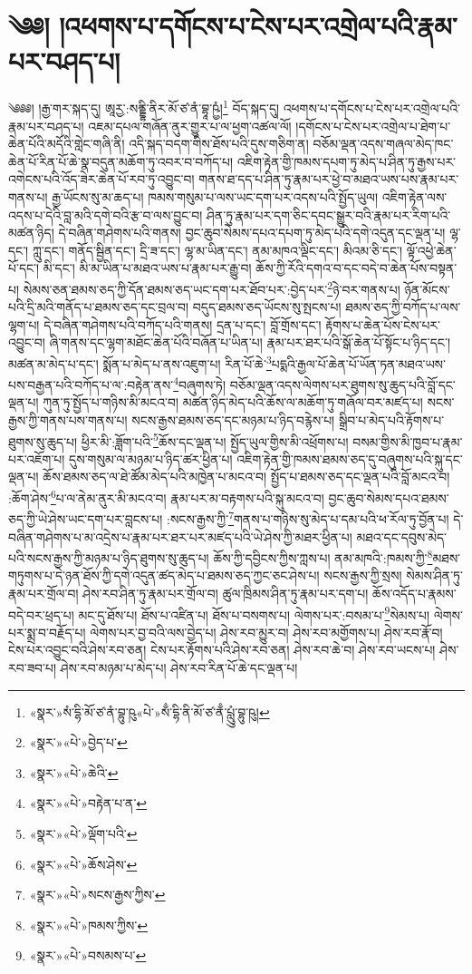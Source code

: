 \chapter{༄༅། །འཕགས་པ་དགོངས་པ་ངེས་པར་འགྲེལ་པའི་རྣམ་པར་བཤད་པ།}༄༅༅། །རྒྱ་གར་སྐད་དུ། ཨཱརྱ་:སནྡྷི་ནིར་མོ་ཙ་ནཾ་བྷཱ་ཥྱཾ།\footnote{«སྣར་»སཾ་དྷི་མོ་ཙ་ནཾ་བྷུ་ཥུ«པེ་»སྃ་དྷི་ནི་མོ་ཙ་ནྃ་པླུུཾ་བྷུ་ཥུ།} བོད་སྐད་དུ། འཕགས་པ་དགོངས་པ་ངེས་པར་འགྲེལ་པའི་རྣམ་པར་བཤད་པ། འཇམ་དཔལ་གཞོན་ནུར་གྱུར་པ་ལ་ཕྱག་འཚལ་ལོ། །དགོངས་པ་ངེས་པར་འགྲེལ་པ་ཐེག་པ་ཆེན་པོའི་མདོའི་གླེང་གཞི་ནི། འདི་སྐད་བདག་གིས་ཐོས་པའི་དུས་གཅིག་ན། བཅོམ་ལྡན་འདས་གཞལ་མེད་ཁང་ཆེན་པོ་རིན་པོ་ཆེ་སྣ་བདུན་མཆོག་ཏུ་འབར་བ་བཀོད་པ། འཇིག་རྟེན་གྱི་ཁམས་དཔག་ཏུ་མེད་པ་ཤིན་ཏུ་རྒྱས་པར་འགེངས་པའི་འོད་ཟེར་ཆེན་པོ་རབ་ཏུ་འབྱུང་བ། གནས་ཐ་དད་པ་ཤིན་ཏུ་རྣམ་པར་ཕྱེ་བ་མཐའ་ཡས་པས་རྣམ་པར་གནས་པ། རྒྱ་ཡོངས་སུ་མ་ཆད་པ། ཁམས་གསུམ་པ་ལས་ཡང་དག་པར་འདས་པའི་སྤྱོད་ཡུལ། འཇིག་རྟེན་ལས་འདས་པ་དེའི་བླ་མའི་དགེ་བའི་རྩ་བ་ལས་བྱུང་བ། ཤིན་ཏུ་རྣམ་པར་དག་ཅིང་དབང་སྒྱུར་བའི་རྣམ་པར་རིག་པའི་མཚན་ཉིད། དེ་བཞིན་གཤེགས་པའི་གནས། བྱང་ཆུབ་སེམས་དཔའ་དཔག་ཏུ་མེད་པའི་དགེ་འདུན་དང་ལྡན་པ། ལྷ་དང་། ཀླུ་དང་། གནོད་སྦྱིན་དང་། དྲི་ཟ་དང་། ལྷ་མ་ཡིན་དང་། ནམ་མཁའ་ལྡིང་དང་། མིའམ་ཅི་དང་། ལྟོ་འཕྱེ་ཆེན་པོ་དང་། མི་དང་། མི་མ་ཡིན་པ་མཐའ་ཡས་པ་རྣམ་པར་རྒྱུ་བ། ཆོས་ཀྱི་རོའི་དགའ་བ་དང་བདེ་བ་ཆེན་པོས་བསྟན་པ། སེམས་ཅན་ཐམས་ཅད་ཀྱི་དོན་ཐམས་ཅད་ཡང་དག་པར་ཐོབ་པར་:བྱེད་པར་\footnote{«སྣར་»«པེ་»བྱེད་པ་}ཉེ་བར་གནས་པ། ཉོན་མོངས་པའི་དྲི་མའི་གནོད་པ་ཐམས་ཅད་དང་བྲལ་བ། བདུད་ཐམས་ཅད་ཡོངས་སུ་སྤངས་པ། ཐམས་ཅད་ཀྱི་བཀོད་པ་ལས་ལྷག་པ། དེ་བཞིན་གཤེགས་པའི་བཀོད་པའི་གནས། དྲན་པ་དང་། བློ་གྲོས་དང་། རྟོགས་པ་ཆེན་པོས་ངེས་པར་འབྱུང་བ། ཞི་གནས་དང་ལྷག་མཐོང་ཆེན་པོའི་བཞོན་པ་ཡིན་པ། རྣམ་པར་ཐར་པའི་སྒོ་ཆེན་པོ་སྟོང་པ་ཉིད་དང་། མཚན་མ་མེད་པ་དང་། སྨོན་པ་མེད་པ་ནས་འཇུག་པ། རིན་པོ་ཆེ་\footnote{«སྣར་»«པེ་»ཆེའི་}པདྨའི་རྒྱལ་པོ་ཆེན་པོ་ཡོན་ཏན་མཐའ་ཡས་པས་བརྒྱན་པའི་བཀོད་པ་ལ་:བརྟེན་ནས་\footnote{«སྣར་»«པེ་»བརྟེན་པ་ན་}བཞུགས་ཏེ། བཅོམ་ལྡན་འདས་ལེགས་པར་ཐུགས་སུ་ཆུད་པའི་བློ་དང་ལྡན་པ། ཀུན་ཏུ་སྤྱོད་པ་གཉིས་མི་མངའ་བ། མཚན་ཉིད་མེད་པའི་ཆོས་ལ་མཆོག་ཏུ་གཞོལ་བར་མཛད་པ། སངས་རྒྱས་ཀྱི་གནས་པས་གནས་པ། སངས་རྒྱས་ཐམས་ཅད་དང་མཉམ་པ་ཉིད་བརྙེས་པ། སྒྲིབ་པ་མེད་པའི་རྟོགས་པ་ཐུགས་སུ་ཆུད་པ། ཕྱིར་མི་:ཟློག་པའི་\footnote{«སྣར་»«པེ་»ལྡོག་པའི་}ཆོས་དང་ལྡན་པ། སྤྱོད་ཡུལ་གྱིས་མི་འཕྲོགས་པ། བསམ་གྱིས་མི་ཁྱབ་པ་རྣམ་པར་འཇོག་པ། དུས་གསུམ་ལ་མཉམ་པ་ཉིད་ཚར་ཕྱིན་པ། འཇིག་རྟེན་གྱི་ཁམས་ཐམས་ཅད་དུ་བཞུགས་པའི་སྐུ་དང་ལྡན་པ། ཆོས་ཐམས་ཅད་ལ་ཐེ་ཚོམ་མེད་པའི་མཁྱེན་པ་མངའ་བ། སྤྱོད་པ་ཐམས་ཅད་དང་ལྡན་པའི་བློ་མངའ་བ། :ཆོག་ཤེས་\footnote{«སྣར་»«པེ་»ཆོས་ཤེས་}པ་ལ་ནེམ་ནུར་མི་མངའ་བ། རྣམ་པར་མ་བརྟགས་པའི་སྐུ་མངའ་བ། བྱང་ཆུབ་སེམས་དཔའ་ཐམས་ཅད་ཀྱི་ཡེ་ཤེས་ཡང་དག་པར་བླངས་པ། :སངས་རྒྱས་ཀྱི་\footnote{«སྣར་»«པེ་»སངས་རྒྱས་ཀྱིས་}གནས་པ་གཉིས་སུ་མེད་པ་དམ་པའི་ཕ་རོལ་ཏུ་བྱོན་པ། དེ་བཞིན་གཤེགས་པ་མ་འདྲེས་པ་རྣམ་པར་ཐར་པར་མཛད་པའི་ཡེ་ཤེས་ཀྱི་མཐར་ཕྱིན་པ། མཐའ་དང་དབུས་མེད་པའི་སངས་རྒྱས་ཀྱི་མཉམ་པ་ཉིད་ཐུགས་སུ་ཆུད་པ། ཆོས་ཀྱི་དབྱིངས་ཀྱིས་ཀླས་པ། ནམ་མཁའི་:ཁམས་ཀྱི་\footnote{«སྣར་»«པེ་»ཁམས་ཀྱིས་}མཐས་གཏུགས་པ་དེ་ཉན་ཐོས་ཀྱི་དགེ་འདུན་ཚད་མེད་པ་ཐམས་ཅད་ཀྱང་ཅང་ཤེས་པ། སངས་རྒྱས་ཀྱི་སྲས། སེམས་ཤིན་ཏུ་རྣམ་པར་གྲོལ་བ། ཤེས་རབ་ཤིན་ཏུ་རྣམ་པར་གྲོལ་བ། ཚུལ་ཁྲིམས་ཤིན་ཏུ་རྣམ་པར་དག་པ། ཆོས་འདོད་པ་རྣམས་བདེ་བར་ཕྲད་པ། མང་དུ་ཐོས་པ། ཐོས་པ་འཛིན་པ། ཐོས་པ་བསགས་པ། ལེགས་པར་:བསམ་པ་\footnote{«སྣར་»«པེ་»བསམས་པ་}སེམས་པ། ལེགས་པར་སྨྲ་བ་བརྗོད་པ། ལེགས་པར་བྱ་བའི་ལས་བྱེད་པ། ཤེས་རབ་མྱུར་བ། ཤེས་རབ་མགྱོགས་པ། ཤེས་རབ་རྣོ་བ། ངེས་པར་འབྱུང་བའི་ཤེས་རབ་ཅན། ངེས་པར་རྟོགས་པའི་ཤེས་རབ་ཅན། ཤེས་རབ་ཆེ་བ། ཤེས་རབ་ཡངས་པ། ཤེས་རབ་ཟབ་པ། ཤེས་རབ་མཉམ་པ་མེད་པ། ཤེས་རབ་རིན་པོ་ཆེ་དང་ལྡན་པ། 